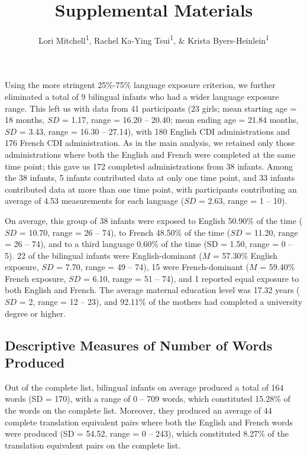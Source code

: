 \documentclass[
  ,man,floatsintext]{apa6}
\title{Supplemental Materials}
\author{Lori Mitchell\textsuperscript{1}, Rachel Ka-Ying Tsui\textsuperscript{1}, \& Krista Byers-Heinlein\textsuperscript{1}}
\date{}
\affiliation{\vspace{0.5cm}\textsuperscript{1} Concordia University}
\begin{document}
\maketitle

\captionsetup[table]{labelformat=empty}

Using the more stringent 25\%-75\% language exposure criterion, we further eliminated a total of 9 bilingual infants who had a wider language exposure range. This left us with data from 41 participants (23 girls; mean starting age = 18 months, \(SD\) = 1.17, range = 16.20 -- 20.40; mean ending age = 21.84 months, \(SD\) = 3.43, range = 16.30 -- 27.14), with 180 English CDI administrations and 176 French CDI administration. As in the main analysis, we retained only those administrations where both the English and French were completed at the same time point; this gave us 172 completed administrations from 38 infants. Among the 38 infants, 5 infants contributed data at only one time point, and 33 infants contributed data at more than one time point, with participants contributing an average of 4.53 measurements for each language (\(SD\) = 2.63, range = 1 -- 10).

On average, this group of 38 infants were exposed to English 50.90\% of the time (\(SD\) = 10.70, range = 26 -- 74), to French 48.50\% of the time (\(SD\) = 11.20, range = 26 -- 74), and to a third language 0.60\% of the time (SD = 1.50, range = 0 -- 5). 22 of the bilingual infants were English-dominant (\(M\) = 57.30\% English exposure, \(SD\) = 7.70, range = 49 -- 74), 15 were French-dominant (\(M\) = 59.40\% French exposure, \(SD\) = 6.10, range = 51 -- 74), and 1 reported equal exposure to both English and French. The average maternal education level was 17.32 years (\(SD\) = 2, range = 12 -- 23), and 92.11\% of the mothers had completed a university degree or higher.

\hypertarget{descriptive-measures-of-number-of-words-produced}{%
\subsection{Descriptive Measures of Number of Words Produced}\label{descriptive-measures-of-number-of-words-produced}}

Out of the complete list, bilingual infants on average produced a total of 164 words (SD = 170), with a range of 0 -- 709 words, which constituted 15.28\% of the words on the complete list. Moreover, they produced an average of 44 complete translation equivalent pairs where both the English and French words were produced (SD = 54.52, range = 0 -- 243), which constituted 8.27\% of the translation equivalent pairs on the complete list.
\end{document}
